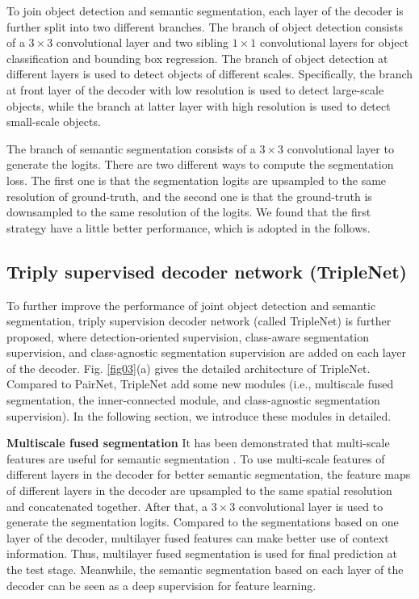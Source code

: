 \documentclass[10pt,twocolumn,letterpaper]{article}
\begin{document}
To join object detection and semantic segmentation, each layer of the decoder is further split into two different branches. The branch of object detection consists of a $3\times 3$ convolutional layer and two sibling $1\times 1$ convolutional layers for object classification and bounding box regression. The branch of object detection at different layers is used to detect objects of different scales. Specifically, the branch at front layer of the decoder with low resolution is used to detect large-scale objects, while the branch at latter layer with high resolution is used to detect small-scale objects. 

The branch of semantic segmentation consists of a $3\times 3$ convolutional layer to generate the logits. There are two different ways to compute the segmentation loss. The first one is that the segmentation logits are upsampled to the same resolution of ground-truth, and the second one is that the ground-truth is downsampled to the same resolution of the logits. We found that the first strategy have a little better performance, which is adopted in the follows. 

\subsection{Triply supervised decoder network (TripleNet)}
To further improve the performance of joint object detection and semantic segmentation, triply supervision decoder network (called TripleNet) is further proposed, where detection-oriented supervision, class-aware segmentation supervision, and class-agnostic segmentation supervision are added on each layer of the decoder. Fig. \ref{fig03}(a) gives the detailed architecture of TripleNet.  Compared to PairNet, TripleNet add some new modules (i.e., multiscale fused segmentation, the inner-connected module, and class-agnostic segmentation supervision).  In the following section, we introduce these modules in detailed.

\textbf{Multiscale fused segmentation} It has been demonstrated that multi-scale features are useful for semantic segmentation \cite{Dvornik_Blitznet_ICCV_2017,Zhao_PSPNet_CVPR_2017,Yu_Dilate_ICLR_2016}. To use multi-scale features of different layers in the decoder for better semantic segmentation, the feature maps of different layers in the decoder are upsampled to the same spatial resolution and concatenated together. After that, a $3\times 3$ convolutional layer is used to generate the segmentation logits. Compared to the segmentations based on one layer of the decoder, multilayer fused features can make better use of context information. Thus, multilayer fused segmentation is used for final prediction at the test stage. Meanwhile, the semantic segmentation based on each layer of the decoder can be seen as a deep supervision for feature learning.
\end{document}
